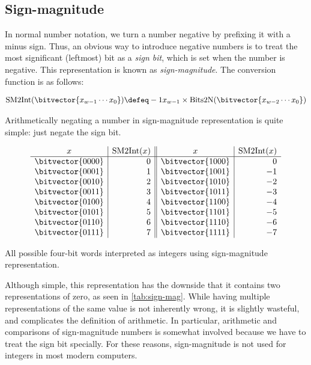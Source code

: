 \subsection{Sign-magnitude}
\label{sec:sign-magnitude}

In normal number notation, we turn a number negative by prefixing it
with a minus sign.  Thus, an obvious way to introduce negative numbers
is to treat the most significant (leftmost) bit as a \emph{sign bit},
which is set when the number is negative.  This representation is
known as \emph{sign-magnitude}.  The conversion function is as
follows:

\begin{definition}
\begin{align*}
  \mathrm{SM2Int}(\bitvector{x_{w-1}\cdots x_{0}}) \defeq -1x_{w-1} \times \mathrm{Bits2N}(\bitvector{x_{w-2}\cdots x_{0}})
\end{align*}
\label{def:sm2int}
\end{definition}

Arithmetically negating a number in sign-magnitude representation is
quite simple: just negate the sign bit.

\begin{table}
  \centering
  \[
  \begin{array}{c|r||c|r}
    x & \mathrm{SM2Int}(x) & x & \mathrm{SM2Int}(x) \\\hline
    \bitvector{0000} & 0 & \bitvector{1000} & 0 \\
    \bitvector{0001} & 1 & \bitvector{1001} & -1 \\
    \bitvector{0010} & 2 & \bitvector{1010} & -2 \\
    \bitvector{0011} & 3 & \bitvector{1011} & -3 \\
    \bitvector{0100} & 4 & \bitvector{1100} & -4 \\
    \bitvector{0101} & 5 & \bitvector{1101} & -5 \\
    \bitvector{0110} & 6 & \bitvector{1110} & -6 \\
    \bitvector{0111} & 7 & \bitvector{1111} & -7 \\
  \end{array}
  \]
  \caption{All possible four-bit words interpreted as integers using
    sign-magnitude representation.}
  \label{tab:sign-mag}
\end{table}

Although simple, this representation has the downside that it contains
two representations of zero, as seen in \cref{tab:sign-mag}.  While
having multiple representations of the same value is not inherently
wrong, it is slightly wasteful, and complicates the definition of
arithmetic.  In particular, arithmetic and comparisons of
sign-magnitude numbers is somewhat involved because we have to treat
the sign bit specially.  For these reasons, sign-magnitude is not used
for integers in most modern computers.

